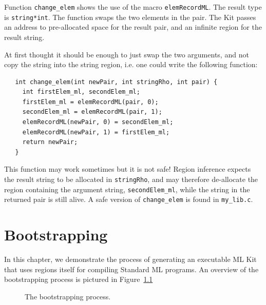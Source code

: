 \documentclass[12pt]{book}
\begin{document}
\begin{example}\label{change_elem.ex}
  Function \texttt{change\_elem} shows the use of
  the macro \texttt{elemRecordML}. The result type is \texttt{string*int}. The
  function swaps the two elements in the pair. The Kit passes an address to
  pre-allocated space for the result pair, and an infinite region for the
  result string.
  
  At first thought it should be enough to just swap the two arguments, and
  not copy the string into the string region, i.e. one could write the
  following function:
\begin{verbatim}
   int change_elem(int newPair, int stringRho, int pair) {
     int firstElem_ml, secondElem_ml;
     firstElem_ml = elemRecordML(pair, 0);
     secondElem_ml = elemRecordML(pair, 1);
     elemRecordML(newPair, 0) = secondElem_ml;
     elemRecordML(newPair, 1) = firstElem_ml;
     return newPair;
   }
\end{verbatim}
  This function may work sometimes but it is not safe! Region
  inference expects the result string to be allocated in
  \texttt{stringRho}, and may therefore de-allocate the region containing
  the argument string, \verb|secondElem_ml|, while the string in the
  returned pair is still alive. A safe version of \verb|change_elem| is
  found in \verb|my_lib.c|.
\end{example}

\chapter{Bootstrapping}

In this chapter, we demonstrate the process of generating an
executable ML Kit that uses regions itself for compiling Standard ML
programs. An overview of the bootstrapping process is pictured in
Figure~\ref{bootstrap.fig}

\begin{figure}
\begin{center}
\end{center}
\caption{The bootstrapping process.}
\label{bootstrap.fig}
\end{figure}
\end{document}
